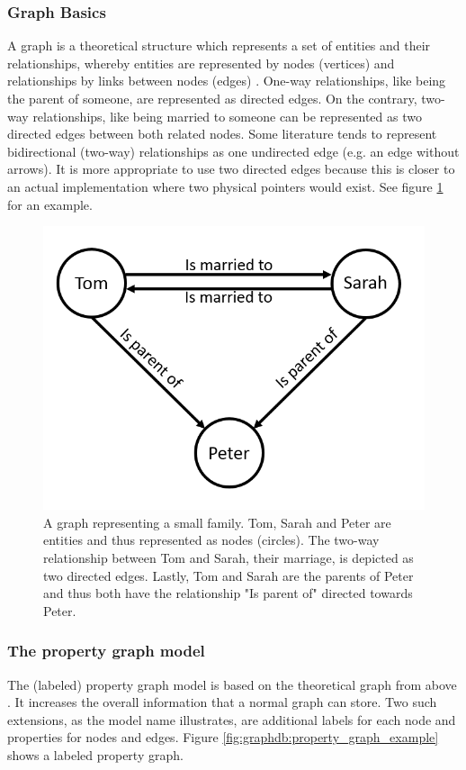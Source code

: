 \subsubsection{Graph Basics}
A graph is a theoretical structure which represents a set of entities and their relationships, whereby entities are represented by nodes (vertices) and relationships by links between nodes (edges) \autocite{maheshlal2015, graphdb2015}. One-way relationships, like being the parent of someone, are represented as directed edges. On the contrary, two-way relationships, like being married to someone can be represented as two directed edges between both related nodes. Some literature tends to represent bidirectional (two-way) relationships as one undirected edge (e.g. an edge without arrows). It is more appropriate to use two directed edges because this is closer to an actual implementation where two physical pointers would exist. See figure \ref{fig:graphdb:graph_example} for an example.

\begin{figure}[ht]
    \centering
    \includegraphics[width=.5\textwidth]{img/graph_example.PNG}
    \caption{A graph representing a small family. Tom, Sarah and Peter are entities and thus represented as nodes (circles). The two-way relationship between Tom and Sarah, their marriage, is depicted as two directed edges. Lastly, Tom and Sarah are the parents of Peter and thus both have the relationship "Is parent of" directed towards Peter.}
    \label{fig:graphdb:graph_example}
\end{figure}



\subsubsection{The property graph model}
The (labeled) property graph model is based on the theoretical graph from above \autocite{maheshlal2015}. It increases the overall information that a normal graph can store. Two such extensions, as the model name illustrates, are additional labels for each node and properties for nodes and edges. Figure \ref{fig:graphdb:property_graph_example} shows a labeled property graph.

